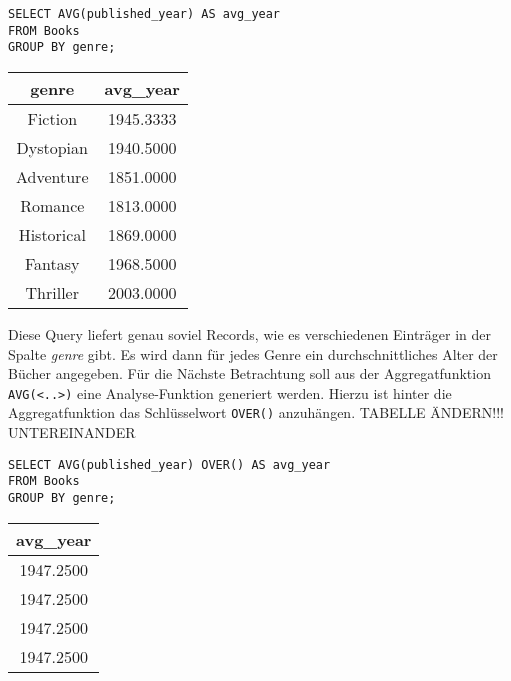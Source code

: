 \begin{minipage}{0.68\textwidth}
	 \begin{lstlisting}
SELECT AVG(published_year) AS avg_year
FROM Books
GROUP BY genre;
	\end{lstlisting}
\end{minipage}
\hfill
\begin{minipage}{0.28\textwidth}
	\centering
	\begin{tabular}{|c|c|}
		\hline
		\textbf{genre} & \textbf{avg\_year} \\
		\hline
		Fiction        & 1945.3333          \\
		\hline
		Dystopian      & 1940.5000          \\
		\hline
		Adventure      & 1851.0000          \\
		\hline
		Romance        & 1813.0000          \\
		\hline
		Historical     & 1869.0000          \\
		\hline
		Fantasy        & 1968.5000          \\
		\hline
		Thriller       & 2003.0000          \\
		\hline
	\end{tabular}
	 \label{tab:avg_year_genre}
\end{minipage}

Diese Query liefert genau soviel Records, wie es verschiedenen Einträger in der
Spalte \textit{genre} gibt. Es wird dann für jedes Genre ein durchschnittliches
Alter der Bücher angegeben. Für die Nächste Betrachtung soll aus der Aggregatfunktion
\texttt{AVG(<..>)} eine Analyse-Funktion generiert werden. Hierzu ist hinter die
Aggregatfunktion das Schlüsselwort \texttt{OVER()} anzuhängen. TABELLE ÄNDERN!!!
UNTEREINANDER

\begin{minipage}{0.68\textwidth}
	 \begin{lstlisting}
SELECT AVG(published_year) OVER() AS avg_year
FROM Books
GROUP BY genre;
	\end{lstlisting}
\end{minipage}
\hfill
\begin{minipage}{0.28\textwidth}
	\centering
	\begin{tabular}{|c|}
		\hline
		\textbf{avg\_year} \\
		\hline
		1947.2500 \\
		\hline
		1947.2500 \\
		\hline
		1947.2500 \\
		\hline
		1947.2500 \\
		\hline
	\end{tabular}
	 \label{tab:avg_year_over}
\end{minipage}

